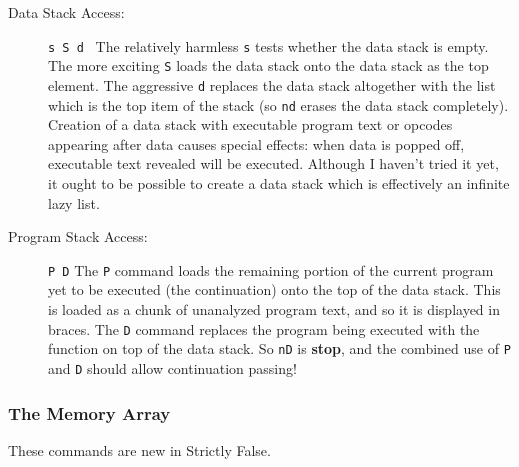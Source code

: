 \documentclass[12pt]{article}
\begin{document}
\begin{description}
\item[Data Stack Access:] {\tt s S d }  The relatively harmless
{\tt s} tests whether the data stack is empty.  The more exciting
{\tt S} loads the data stack onto the data stack as the top element.
The aggressive {\tt d} replaces the data stack altogether with the
list which is the top item of the stack (so {\tt nd} erases the data
stack completely).  Creation of a data stack with executable program
text or opcodes appearing after data causes special effects:  when
data is popped off, executable text revealed will be executed.
Although I haven't tried it yet, it ought to be possible to create
a data stack which is effectively an infinite lazy list.

\item[Program Stack Access:] {\tt P D} The {\tt P} command loads the
remaining portion of the current program yet to be executed (the
continuation) onto the top of the data stack.  This is loaded as a
chunk of unanalyzed program text, and so it is displayed in braces.
The {\tt D} command replaces the program being executed with the
function on top of the data stack.  So {\tt nD} is {\bf stop}, and the
combined use of {\tt P} and {\tt D} should allow continuation passing!
\end{description}
\subsubsection{The Memory Array}

These commands are new in Strictly False.
\end{document}
